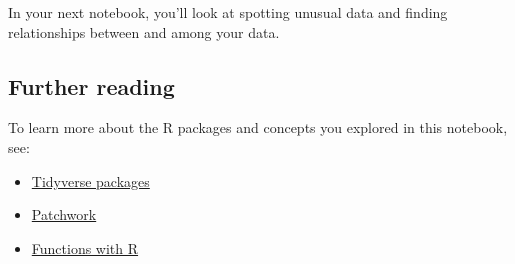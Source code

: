 \documentclass[
]{article}
\providecommand{\tightlist}{%
  \setlength{\itemsep}{0pt}\setlength{\parskip}{0pt}}
\begin{document}
In your next notebook, you'll look at spotting unusual data and finding
relationships between and among your data.

\hypertarget{further-reading}{%
\subsection{Further reading}\label{further-reading}}

To learn more about the R packages and concepts you explored in this
notebook, see:

\begin{itemize}
\tightlist
\item
  \href{https://www.tidyverse.org/packages/}{Tidyverse packages}
\item
  \href{https://patchwork.data-imaginist.com/}{Patchwork}
\item
  \href{https://skirmer.github.io/presentations/functions_with_r.html\#1}{Functions
  with R}
\end{itemize}
\end{document}

